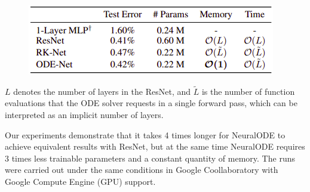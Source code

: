 \documentclass[a0]{a0poster}
\begin{document}
\begin{textblock}{7.0}
\begin{figure}
\centering
\includegraphics[width = 0.8 \linewidth]{figures/MNIST_test.png}
\caption{}
\end{figure} $L$ denotes the number of layers in the ResNet, and $\tilde{L}$ is the number of function evaluations that the ODE solver requests in a single forward pass, which can be interpreted as an implicit number of layers.

Our experiments demonstrate that it takes 4 times longer for NeuralODE to achieve equivalent results with ResNet, but at the same time NeuralODE requires 3 times less trainable parameters and a constant quantity of memory. The runs were carried out under the same conditions in Google Coollaboratory with Google Compute Engine (GPU) support.

\end{textblock}
\end{document}
